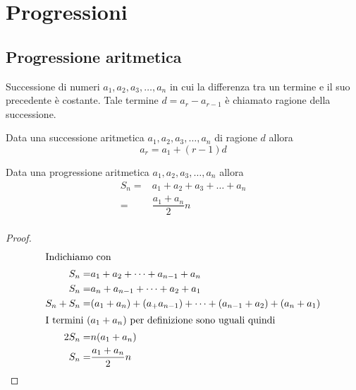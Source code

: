 
\chapter{Progressioni}\label{ch:progressioni}
\section{Progressione aritmetica}\label{sec:progressione-aritmetica}
\begin{defn}\label{defn:ProgAritm1}
	Successione di numeri $a_1,a_2,a_3,\dots,a_n$ in cui la differenza tra un termine e il suo precedente è costante. Tale termine $d=a_r-a_{r-1}$ è chiamato ragione della successione.
\end{defn}
\begin{prop}
	Data una successione aritmetica $a_1,a_2,a_3,\dots,a_n$ di ragione $d$ allora\[a_r=a_1+(r-1)d\]
\end{prop}
\begin{thm}\label{thm:SommaProgAritm1}
Data una progressione aritmetica $a_1,a_2,a_3,\dots,a_n$ allora
\begin{align*}
	S_n=&a_1+a_2+a_3+\dots+a_n\\
	=&\dfrac{a_1+a_n}{2}n\\
\end{align*}
\end{thm}
\begin{proof}
\begin{align*}
\intertext{Indichiamo con}
S_n=&a_1+a_2+\dots+a_{n-1}+a_n\\
S_n=&a_n+a_{n-1}+\dots+a_2+a_1\\
S_n+S_n=&(a_1+a_n)+(a_+a_{n-1})+\dots+(a_{n-1}+a_2)+(a_n+a_1)\\
\intertext{I termini $(a_1+a_n)$ per definizione sono uguali quindi}
2S_n=&n(a_1+a_n)\\
S_n=&\dfrac{a_1+a_n}{2}n
\end{align*}
\end{proof}

